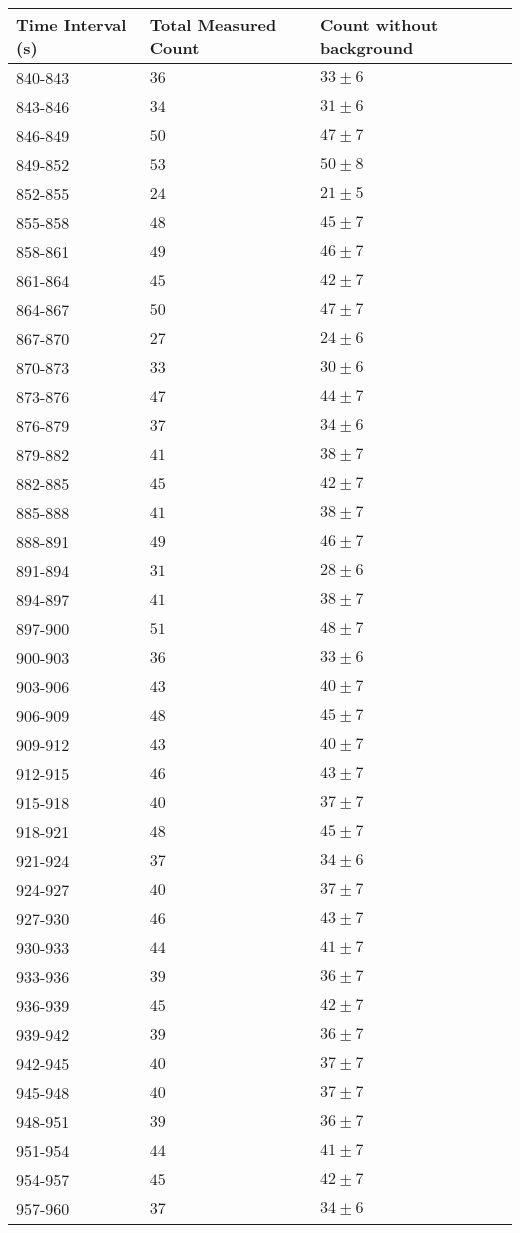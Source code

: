 \begin{tabular}{| p{} | p{} | p{} |}\hline
Time Interval (s) & Total Measured Count & Count without background\\
\hline
840-843 & $36$ & $33\pm 6$\\
843-846 & $34$ & $31\pm 6$\\
846-849 & $50$ & $47\pm 7$\\
849-852 & $53$ & $50\pm 8$\\
852-855 & $24$ & $21\pm 5$\\
855-858 & $48$ & $45\pm 7$\\
858-861 & $49$ & $46\pm 7$\\
861-864 & $45$ & $42\pm 7$\\
864-867 & $50$ & $47\pm 7$\\
867-870 & $27$ & $24\pm 6$\\
870-873 & $33$ & $30\pm 6$\\
873-876 & $47$ & $44\pm 7$\\
876-879 & $37$ & $34\pm 6$\\
879-882 & $41$ & $38\pm 7$\\
882-885 & $45$ & $42\pm 7$\\
885-888 & $41$ & $38\pm 7$\\
888-891 & $49$ & $46\pm 7$\\
891-894 & $31$ & $28\pm 6$\\
894-897 & $41$ & $38\pm 7$\\
897-900 & $51$ & $48\pm 7$\\
900-903 & $36$ & $33\pm 6$\\
903-906 & $43$ & $40\pm 7$\\
906-909 & $48$ & $45\pm 7$\\
909-912 & $43$ & $40\pm 7$\\
912-915 & $46$ & $43\pm 7$\\
915-918 & $40$ & $37\pm 7$\\
918-921 & $48$ & $45\pm 7$\\
921-924 & $37$ & $34\pm 6$\\
924-927 & $40$ & $37\pm 7$\\
927-930 & $46$ & $43\pm 7$\\
930-933 & $44$ & $41\pm 7$\\
933-936 & $39$ & $36\pm 7$\\
936-939 & $45$ & $42\pm 7$\\
939-942 & $39$ & $36\pm 7$\\
942-945 & $40$ & $37\pm 7$\\
945-948 & $40$ & $37\pm 7$\\
948-951 & $39$ & $36\pm 7$\\
951-954 & $44$ & $41\pm 7$\\
954-957 & $45$ & $42\pm 7$\\
957-960 & $37$ & $34\pm 6$\\
\hline
\end{tabular}\\
